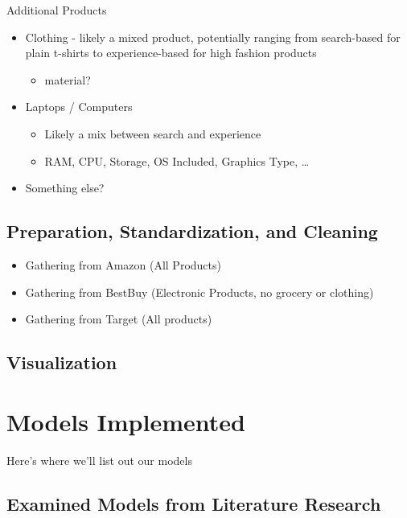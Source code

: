 \documentclass[
  letterpaper,
  DIV=11,
  numbers=noendperiod]{scrreprt}
\providecommand{\tightlist}{%
  \setlength{\itemsep}{0pt}\setlength{\parskip}{0pt}}\usepackage{longtable,booktabs,array}
\begin{document}
Additional Products

\begin{itemize}
\item
  Clothing - likely a mixed product, potentially ranging from
  search-based for plain t-shirts to experience-based for high fashion
  products

  \begin{itemize}
  \tightlist
  \item
    material?
  \end{itemize}
\item
  Laptops / Computers

  \begin{itemize}
  \item
    Likely a mix between search and experience
  \item
    RAM, CPU, Storage, OS Included, Graphics Type, \ldots{}
  \end{itemize}
\item
  Something else?
\end{itemize}

\section{Preparation, Standardization, and
Cleaning}\label{preparation-standardization-and-cleaning}

\begin{itemize}
\item
  Gathering from Amazon (All Products)
\item
  Gathering from BestBuy (Electronic Products, no grocery or clothing)
\item
  Gathering from Target (All products)
\end{itemize}

\section{Visualization}\label{visualization}


\chapter{Models Implemented}\label{sec-models-implemented}

Here's where we'll list out our models

\section{Examined Models from Literature
Research}\label{examined-models-from-literature-research}
\end{document}
